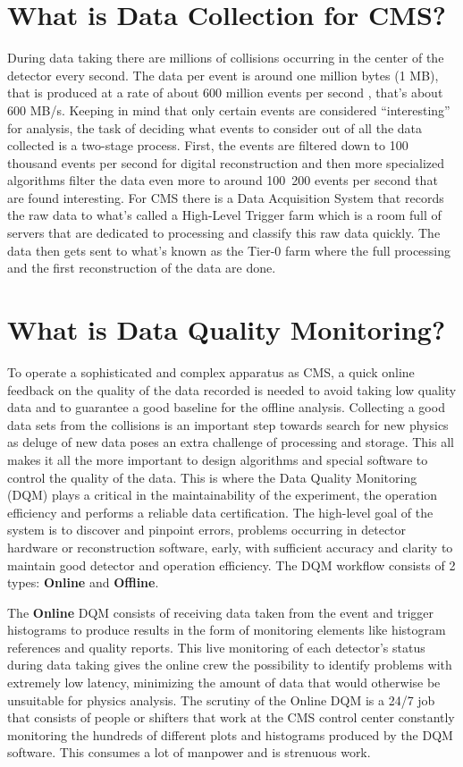 \section{What is Data Collection for CMS?}

During data taking there are millions of collisions occurring in the center of the detector every second. The data per event is around one million bytes (1 MB), that is produced at a rate of about 600 million events per second \cite{datataking}, that’s about 600 MB/s. Keeping in mind that only certain events are considered “interesting” for analysis, the task of deciding what events to consider out of all the data collected is a two-stage process. First, the events are filtered down to 100 thousand events per second for digital reconstruction and then more specialized algorithms filter the data even more to around 100~200 events per second that are found interesting.
For CMS there is a Data Acquisition System that records the raw data to what’s called a High-Level Trigger farm which is a room full of servers that are dedicated to processing and classify this raw data quickly. The data then gets sent to what’s known as the Tier-0 farm where the full processing and the first reconstruction of the data are done. \cite{cmscomputing} 


\section{What is Data Quality Monitoring?}
To operate a sophisticated and complex apparatus as CMS, a quick online feedback on the quality of the data recorded is needed to avoid taking low quality data and to guarantee a good baseline for the offline analysis. Collecting a good data sets from the collisions is an important step towards search for new physics as deluge of new data poses an extra challenge of processing and storage. This all makes it all the more important to design algorithms and special software to control the quality of the data. This is where the Data Quality Monitoring (DQM) plays a critical in the maintainability of the experiment, the operation efficiency and performs a reliable data certification.  The high-level goal of the system is to discover and pinpoint errors, problems occurring in detector hardware or reconstruction software, early, with sufficient accuracy and clarity to maintain good detector and operation efficiency. The DQM workflow consists of 2 types: \textbf{Online}  and \textbf{Offline}.

The \textbf{Online} DQM consists of receiving data taken from the event and trigger histograms to produce results in the form of monitoring elements like histogram references and quality reports. This live monitoring of each detector’s status during data taking gives the online crew the possibility to identify problems with extremely low latency, minimizing the amount of data that would otherwise be unsuitable for physics analysis. The scrutiny of the Online DQM is a 24/7 job that consists of people or shifters that work at the CMS control center constantly monitoring the hundreds of different plots and histograms produced by the DQM software. This consumes a lot of manpower and is strenuous work.


